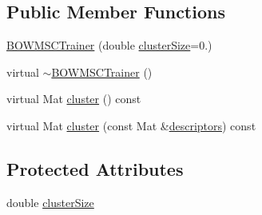 \subsection*{Public Member Functions}
\begin{DoxyCompactItemize}
\item 
\hyperlink{classcv_1_1of2_1_1BOWMSCTrainer_a43bf6d3583462f149873ce9cb82277b9}{B\-O\-W\-M\-S\-C\-Trainer} (double \hyperlink{classcv_1_1of2_1_1BOWMSCTrainer_a22555d229375f2fb164b2a902076f6c6}{cluster\-Size}=0.)
\item 
virtual \hyperlink{classcv_1_1of2_1_1BOWMSCTrainer_aec2a067376fcea31fe40a250324a79bf}{$\sim$\-B\-O\-W\-M\-S\-C\-Trainer} ()
\item 
virtual Mat \hyperlink{classcv_1_1of2_1_1BOWMSCTrainer_a48670b14f9c4a142dda858869ce373bc}{cluster} () const 
\item 
virtual Mat \hyperlink{classcv_1_1of2_1_1BOWMSCTrainer_a0c3faac3caf5e7e802b799014ecc3547}{cluster} (const Mat \&\hyperlink{compat_8hpp_a1e3702ddbca6258f57508c22eff26bf2}{descriptors}) const 
\end{DoxyCompactItemize}
\subsection*{Protected Attributes}
\begin{DoxyCompactItemize}
\item 
double \hyperlink{classcv_1_1of2_1_1BOWMSCTrainer_a22555d229375f2fb164b2a902076f6c6}{cluster\-Size}
\end{DoxyCompactItemize}


